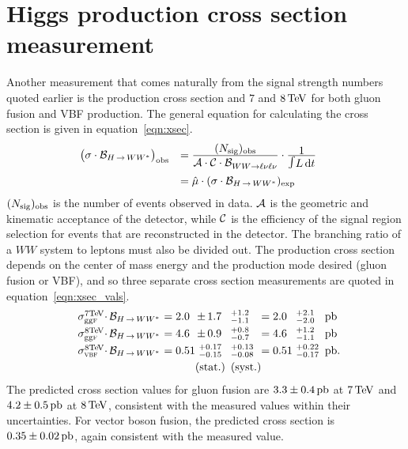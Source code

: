 \section{Higgs production cross section measurement}

Another measurement that comes naturally from the signal strength numbers quoted earlier is the production cross section and $7$ and $8 \TeV$ for both gluon fusion and VBF production. The general equation for calculating the cross section is given in equation~\ref{eqn:xsec}. 
%
\begin{equation}
\begin{array}{ll}
\nq\big(\sigma \cdot\mathcal{B}_{\HWW}\big)_\obs
&=
\frac{\displaystyle (\Nsig)_\obs}
     {\displaystyle \Acc\cdot\Cor\cdot\mathcal{B}_{WW\rightarrow \ell\nu\ell\nu}^{\phantom{X}}}
\cdot
\frac{\displaystyle 1}{\displaystyle\Lint} \\
\clineskip
\clineskip
&= 
{\displaystyle \hat{\mu} \cdot (\sigma\cdot\mathcal{B}_{\HWW})_\exp}
\end{array}
\label{eqn:xsec}
\end{equation}
%
$(N_{\rm sig})_{\rm obs}$ is the number of events observed in data. $\mathcal{A}$ is the geometric and kinematic acceptance of the detector, while $\mathcal{C}$ is the efficiency of the signal region selection for events that are reconstructed in the detector. The branching ratio of a $WW$ system to leptons must also be divided out. The production cross section depends on the center of mass energy and the production mode desired (gluon fusion or VBF), and so three separate cross section measurements are quoted in equation~\ref{eqn:xsec_vals}.
%
\begin{equation}
\begin{array}{lllllll}
\np\sigma_{\scggF}^{7\!\TeV}{\!\CDOT}\mathcal{B}_{\HWW}\np&= 2.0 \np\no&{\PM}1.7            \no\!&^{+1.2}_{-1.1}  \np\no&=2.0 \np\no&\,\,^{+2.1}_{-2.0}   \np&\pb \nq\\ \clineskip
\np\sigma_{\scggF}^{8\!\TeV}{\!\CDOT}\mathcal{B}_{\HWW}\np&= 4.6 \np\no&{\PM}0.9            \no\!&^{+0.8}_{-0.7}  \np\no&=4.6 \np\no&\,\,^{+1.2}_{-1.1}    \np&\pb \nq\\ \clineskip
\np\sigma_{\scVX }^{8\!\TeV}{\!\CDOT}\mathcal{B}_{\HWW}\np&= 0.51\np\no&\,\,^{+0.17}_{-0.15}\no\!&^{+0.13}_{-0.08}\np\no&=0.51\np\no&\,\,^{+0.22}_{-0.17} \np&\pb.\nq\\ \clineskip
\np                                                       &      \np\no&\textrm{(stat.)}    \no\!&\textrm{(syst.)}\np\no
\end{array}
\label{eqn:xsec_vals}
\end{equation}
%
The predicted cross section values for gluon fusion are $3.3 \pm 0.4 \mbox{\,pb}$ at $7 \TeV$ and $4.2 \pm 0.5 \mbox{\,pb}$ at $8 \TeV$, consistent with the measured values within their uncertainties. For vector boson fusion, the predicted cross section is $0.35 \pm 0.02 \mbox{\,pb}$, again consistent with the measured value. 

